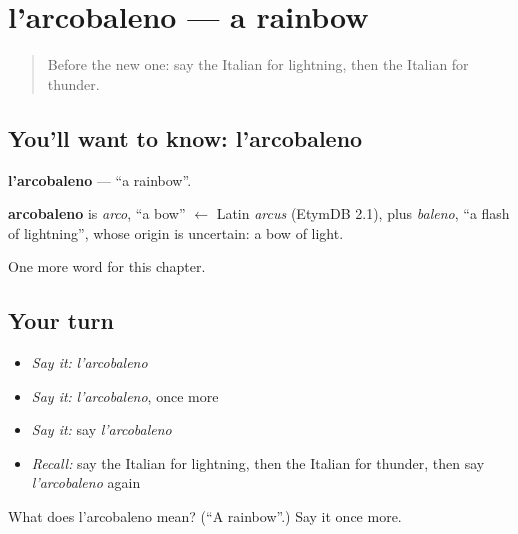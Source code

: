 \section[l'arcobaleno]{l'arcobaleno — a rainbow}

\label{lesson:IT-C256-arcobaleno}



\begin{quote}
Before the new one: say the Italian for lightning, then the Italian for thunder.
\end{quote}

\subsection*{You'll want to know: l'arcobaleno}
\textbf{l'arcobaleno} — \textquotedblleft{}a rainbow\textquotedblright{}.

\begin{cousinweb}
\textbf{arcobaleno} is \emph{arco}, \textquotedblleft{}a bow\textquotedblright{} $\leftarrow$ Latin \emph{arcus} (EtymDB 2.1), plus \emph{baleno}, \textquotedblleft{}a flash of lightning\textquotedblright{}, whose origin is uncertain: a bow of light.
\end{cousinweb}

\begin{grammarlens}[title={What you've built}]
One more word for this chapter.
\end{grammarlens}

\subsection*{Your turn}
\begin{itemize}
\raggedright
  \item \emph{Say it:} \emph{l'arcobaleno}
  \item \emph{Say it:} \emph{l'arcobaleno}, once more
  \item \emph{Say it:} say \emph{l'arcobaleno}
  \item \emph{Recall:} say the Italian for lightning, then the Italian for thunder, then say \emph{l'arcobaleno} again
\end{itemize}

\begin{tcolorbox}[breakable,colback=teal!4,colframe=teal!35!black,title={Before you move on}]
What does l'arcobaleno mean? (\textquotedblleft{}A rainbow\textquotedblright{}.) Say it once more.
\end{tcolorbox}
